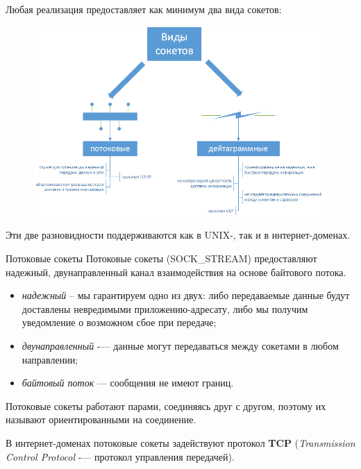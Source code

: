\documentclass{beamer}
\begin{document}
\begin{frame}
    Любая реализация предоставляет как минимум два вида сокетов:
	\begin{figure}[h]
		\centering
		\includegraphics[scale=0.5]{images/lec12-pic04.png}
	\end{figure}
	Эти две разновидности поддерживаются как в UNIX-, так и в интернет-доменах.
\end{frame}

\begin{frame}{Потоковые сокеты}
    Потоковые сокеты (SOCK\_STREAM) предоставляют надежный, двунаправленный канал взаимодействия на основе байтового потока.
    \begin{itemize}
        \item \textit{надежный} -- мы гарантируем одно из двух: либо передаваемые данные будут доставлены невредимыми приложению-адресату, либо мы получим уведомление о возможном сбое при передаче;
        \item \textit{двунаправленный} -— данные могут передаваться между сокетами в любом направлении;
        \item \textit{байтовый поток} — сообщения не имеют границ.
    \end{itemize}
    
    Потоковые сокеты работают парами, соединяясь друг с другом, поэтому их называют ориентированными на соединение. 
    
    В интернет-доменах потоковые сокеты задействуют протокол \textbf{TCP} (\textit{Transmission Control Protocol} -— протокол управления передачей).
\end{frame}
\end{document}
